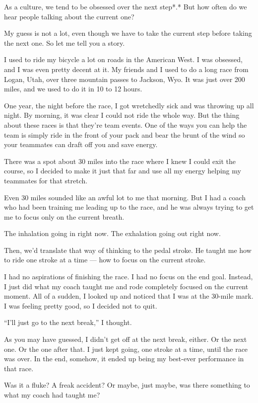 As a culture, we tend to be obsessed over the next step*.* But how often
do we hear people talking about the current one?

My guess is not a lot, even though we have to take the current step
before taking the next one. So let me tell you a story.

I used to ride my bicycle a lot on roads in the American West. I was
obsessed, and I was even pretty decent at it. My friends and I used to
do a long race from Logan, Utah, over three mountain passes to Jackson,
Wyo. It was just over 200 miles, and we used to do it in 10 to 12 hours.

One year, the night before the race, I got wretchedly sick and was
throwing up all night. By morning, it was clear I could not ride the
whole way. But the thing about these races is that they're team events.
One of the ways you can help the team is simply ride in the front of
your pack and bear the brunt of the wind so your teammates can draft off
you and save energy.

There was a spot about 30 miles into the race where I knew I could exit
the course, so I decided to make it just that far and use all my energy
helping my teammates for that stretch.

Even 30 miles sounded like an awful lot to me that morning. But I had a
coach who had been training me leading up to the race, and he was always
trying to get me to focus only on the current breath.

The inhalation going in right now. The exhalation going out right now.

Then, we'd translate that way of thinking to the pedal stroke. He taught
me how to ride one stroke at a time --- how to focus on the current
stroke.

I had no aspirations of finishing the race. I had no focus on the end
goal. Instead, I just did what my coach taught me and rode completely
focused on the current moment. All of a sudden, I looked up and noticed
that I was at the 30-mile mark. I was feeling pretty good, so I decided
not to quit.

``I'll just go to the next break,'' I thought.

As you may have guessed, I didn't get off at the next break, either. Or
the next one. Or the one after that. I just kept going, one stroke at a
time, until the race was over. In the end, somehow, it ended up being my
best-ever performance in that race.

Was it a fluke? A freak accident? Or maybe, just maybe, was there
something to what my coach had taught me?

